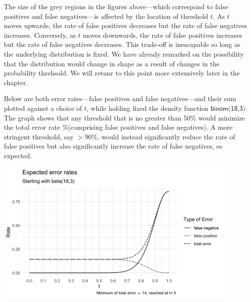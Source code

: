 \documentclass[10pt,dvipsnames,enabledeprecatedfontcommands]{scrartcl}
\begin{document}
The size of the grey regions in the figures above---which correspond to
false positives and false negatives---is affected by the location of
threshold \(t\). As \(t\) moves upwards, the rate of false positives
decreases but the rate of false negatives increases. Conversely, as
\(t\) moves downwards, the rate of false positives increases but the
rate of false negatives decreases. This trade-off is inescapable so long
as the underlying distribution is fixed. We have already remarked on the
possibility that the distribution would change in shape as a result of
changes in the probability threhsold. We will retunr to this point more
extensively later in the chapter.

Below are both error rates---false positives and false negatives---and
their sum plotted against a choice of \(t\), while holding fixed the
density function \(\textsf{binom(18,3)}\). The graph shows that any
threshold that is no greater than 50\% would minimize the total error
rate \%(comprising false positives and false negatives). A more
stringent threshold, say \(>90\%\), would instead significantly reduce
the rate of false positives but also significantly increase the rate of
false negatives, es expected.

\begin{center}
    \includegraphics[width=12cm]{errors.png}
\end{center}
\end{document}
